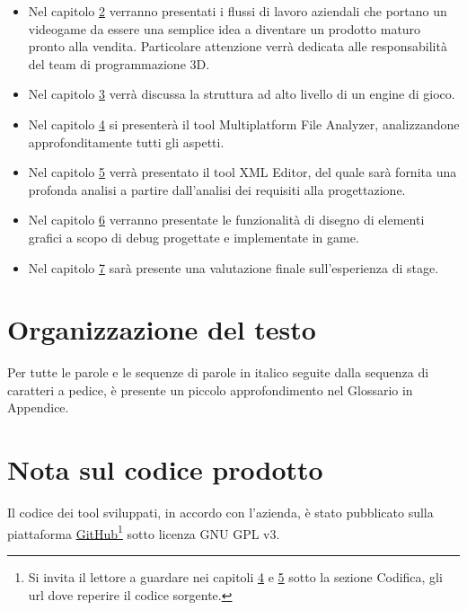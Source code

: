 \begin{itemize}
	\item Nel capitolo \hyperref[cap:milestone]{2} verranno presentati i flussi di lavoro aziendali che portano un videogame da essere una semplice idea a diventare un prodotto maturo pronto alla vendita. Particolare attenzione verrà dedicata alle responsabilità del team di programmazione 3D.
	
	\item Nel capitolo \hyperref[cap:engine-di-gioco]{3} verrà discussa la struttura ad alto livello di un engine di gioco.
	
	\item Nel capitolo \hyperref[cap:multiplatform-file-analyzer]{4} si presenterà il tool Multiplatform File Analyzer, analizzandone approfonditamente tutti gli aspetti.
	
	\item Nel capitolo \hyperref[cap:xml-editor]{5} verrà presentato il tool XML Editor, del quale sarà fornita una profonda analisi a partire dall'analisi dei requisiti alla progettazione.
	
	\item Nel capitolo \hyperref[cap:game]{6} verranno presentate le funzionalità di disegno di elementi grafici a scopo di debug progettate e implementate in game.
	
	\item Nel capitolo \hyperref[cap:conclusioni]{7} sarà presente una valutazione finale sull'esperienza di stage.
\end{itemize}

\section{Organizzazione del testo}

Per tutte le parole e le sequenze di parole in italico seguite dalla sequenza di caratteri  a pedice, è presente un piccolo approfondimento nel Glossario in Appendice.

\section{Nota sul codice prodotto}

Il codice dei tool sviluppati, in accordo con l'azienda, è stato pubblicato sulla piattaforma \hyperref{https://github.com/}{}{}{GitHub}\footnote{Si invita il lettore a guardare nei capitoli \hyperref[cap:multiplatform-file-analyzer]{4} e \hyperref[cap:xml-editor]{5} sotto la sezione Codifica, gli url dove reperire il codice sorgente.} sotto licenza GNU GPL v3.\\

